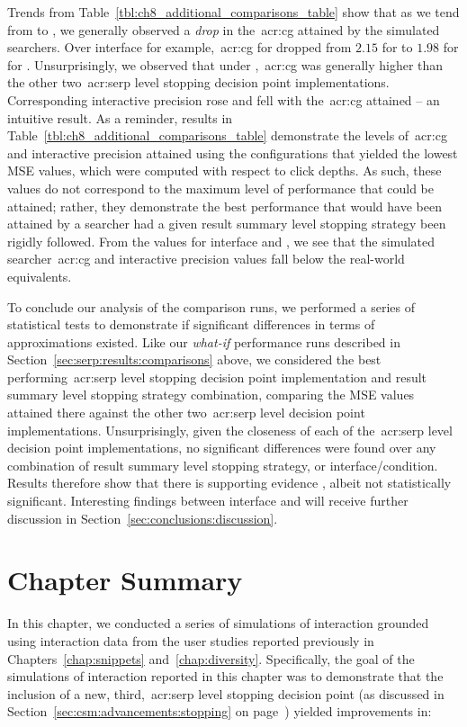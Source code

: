 Trends from Table~\ref{tbl:ch8_additional_comparisons_table} show that as we tend from  to , we generally observed a \emph{drop} in the~\gls{acr:cg} attained by the simulated searchers. Over interface  for example,~\gls{acr:cg} for  dropped from $2.15$ for  to $1.98$ for  for . Unsurprisingly, we observed that under ,~\gls{acr:cg} was generally higher than the other two~\gls{acr:serp} level stopping decision point implementations. Corresponding interactive precision rose and fell with the~\gls{acr:cg} attained -- an intuitive result. As a reminder, results in Table~\ref{tbl:ch8_additional_comparisons_table} demonstrate the levels of~\gls{acr:cg} and interactive precision attained using the configurations that yielded the lowest MSE values, which were computed with respect to click depths. As such, these values do not correspond to the maximum level of performance that could be attained; rather, they demonstrate the best performance that would have been attained by a searcher had a given result summary level stopping strategy been rigidly followed. From the  values for interface  and , we see that the simulated searcher~\gls{acr:cg} and interactive precision values fall below the real-world equivalents.

To conclude our analysis of the comparison runs, we performed a series of statistical tests to demonstrate if significant differences in terms of approximations existed. Like our \emph{what-if} performance runs described in Section~\ref{sec:serp:results:comparisons} above, we considered the best performing~\gls{acr:serp} level stopping decision point implementation and result summary level stopping strategy combination, comparing the MSE values attained there against the other two~\gls{acr:serp} level decision point implementations. Unsurprisingly, given the closeness of each of the~\gls{acr:serp} level decision point implementations, no significant differences were found over any combination of result summary level stopping strategy, or interface/condition. Results therefore show that there is supporting evidence , albeit not statistically significant. Interesting findings between interface  and  will receive further discussion in Section~\ref{sec:conclusions:discussion}.

\section{Chapter Summary}
In this chapter, we conducted a series of simulations of interaction grounded using interaction data from the user studies reported previously in Chapters~\ref{chap:snippets} and~\ref{chap:diversity}. Specifically, the goal of the simulations of interaction reported in this chapter was to demonstrate that the inclusion of a new, third,~\gls{acr:serp} level stopping decision point (as discussed in Section~\ref{sec:csm:advancements:stopping} on page~\pageref{sec:csm:advancements:stopping}) yielded improvements in:

